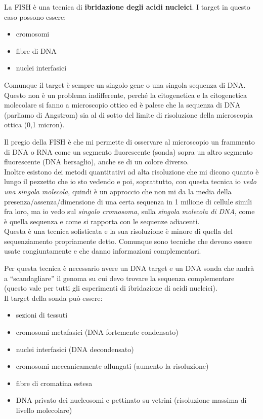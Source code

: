 \documentclass[11pt]{book}
\begin{document}
La FISH è una tecnica di \textbf{ibridazione degli acidi nucleici}. I target in questo caso possono essere:
\begin{itemize}
\item cromosomi
\item fibre di DNA
\item nuclei interfasici
\end{itemize}
Comunque il target è sempre un singolo gene o una singola sequenza di DNA. Questo non è un problema indifferente, perché la citogenetica e la citogenetica molecolare si fanno a microscopio ottico ed è palese che la sequenza di DNA (parliamo di Angstrom) sia al di sotto del limite di risoluzione della microscopia ottica (0,1 micron).

Il pregio della FISH è che mi permette di osservare al microscopio un frammento di DNA o RNA come un segmento fluorescente (sonda) sopra un altro segmento fluorescente (DNA bersaglio), anche se di un colore diverso.\\
Inoltre esistono dei metodi quantitativi ad alta risoluzione che mi dicono quanto è lungo il pezzetto che io sto vedendo e poi, soprattutto, con questa tecnica io \emph{vedo una singola molecola}, quindi è un approccio che non mi da la media della presenza/assenza/dimensione di una certa sequenza in 1 milione di cellule simili fra loro, ma io vedo sul \emph{singolo cromosoma}, sulla \emph{singola molecola di DNA}, come è quella sequenza e come si rapporta con le sequenze adiacenti.\\
Questa è una tecnica sofisticata e la sua risoluzione è minore di quella del sequenziamento propriamente detto. Comunque sono tecniche che devono essere usate congiuntamente e che danno informazioni complementari.

Per questa tecnica è necessario avere un DNA target e un DNA sonda che andrà a ``scandagliare'' il genoma su cui devo trovare la sequenza complementare (questo vale per tutti gli esperimenti di ibridazione di acidi nucleici).\\
Il target della sonda può essere:
\begin{itemize}
\item sezioni di tessuti
\item cromosomi metafasici (DNA fortemente condensato)
\item nuclei interfasici (DNA decondensato)
\item cromosomi meccanicamente allungati (aumento la risoluzione)
\item fibre di cromatina estesa
\item DNA privato dei nucleosomi e pettinato su vetrini (risoluzione massima di livello molecolare)
\end{itemize}
\end{document}
